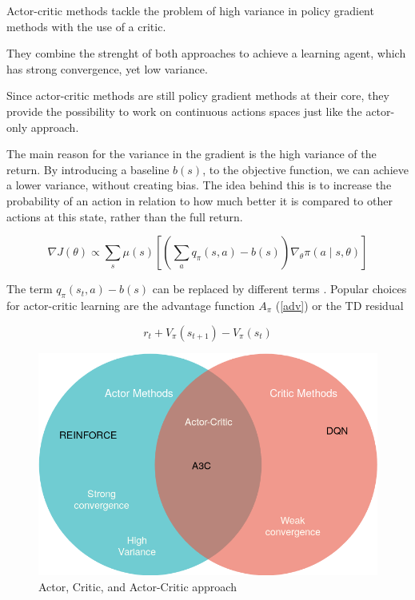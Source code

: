 Actor-critic methods tackle the problem of high variance in policy gradient methods with the use of a critic.

They combine the strenght of both approaches to achieve a learning agent, which has strong convergence, yet low variance.

Since actor-critic methods are still policy gradient methods at their core, they provide the possibility to work on continuous actions spaces just like the actor-only approach.

The main reason for the variance in the gradient is the high variance of the return. By introducing a baseline $ b(s)$, to the objective function, we can achieve a lower variance, without creating bias.
The idea behind this is to increase the probability of an action in relation to how much better it is compared to other actions at this state, rather than the full return.

\begin{equation}
\nabla J(\theta) \propto \sum_s \mu(s) \left[ \left( \sum_a q_\pi (s,a) -b(s)\right) \nabla_\theta \pi (a \mid s, \theta) \right]
\end{equation}

The term $q_\pi(s_t,a) -b(s)$ can be replaced by different terms \citep{Schulman15}.
Popular choices for actor-critic learning are the advantage function $A_\pi$ (\ref{adv}) or the TD residual 

\begin{equation}
r_t + V_\pi(s_{t+1}) - V_\pi(s_t)
\end{equation} 



\begin{figure}
\includegraphics[scale=0.5]{bilder/actorcritic1.png}
\caption{Actor, Critic, and Actor-Critic approach}
\end{figure}

